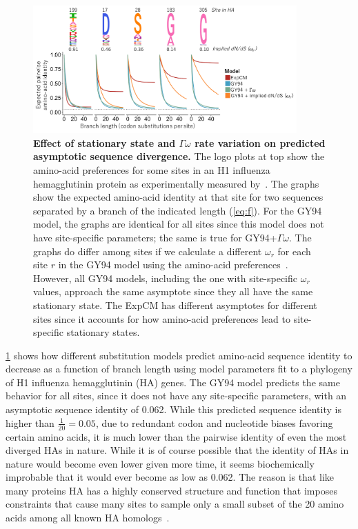 \documentclass[11pt]{article}
\begin{document}
\begin{figure}
\centerline{\includegraphics[width=0.90\textwidth]{figures/decay.pdf}}
\caption{\label{fig:decay}
\textbf{Effect of stationary state and $\Gamma\omega$ rate variation on predicted asymptotic sequence divergence.}
The logo plots at top show the amino-acid preferences for some sites in an H1 influenza hemagglutinin protein as experimentally measured by~\citet{doud2016accurate}.
The graphs show the expected amino-acid identity at that site for two sequences separated by a branch of the indicated length (\ref{eq:f}).
For the GY94 model, the graphs are identical for all sites since this model does not have site-specific parameters; the same is true for GY94+$\Gamma\omega$.
The graphs do differ among sites if we calculate a different $\omega_r$ for each site $r$ in the GY94 model using the amino-acid preferences~\citep[\ref{eq:w_r};][]{spielman2015relationship}.
However, all GY94 models, including the one with site-specific $\omega_r$ values, approach the same asymptote since they all have the same stationary state.
The ExpCM has different asymptotes for different sites since it accounts for how amino-acid preferences lead to site-specific stationary states.
}
\end{figure}

\ref{fig:decay} shows how different substitution models predict amino-acid sequence identity to decrease as a function of branch length using model parameters fit to a phylogeny of H1 influenza hemagglutinin (HA) genes.
The GY94 model predicts the same behavior for all sites, since it does not have any site-specific parameters, with an asymptotic sequence identity of 0.062. 
While this predicted sequence identity is higher than $\frac{1}{20} = 0.05$, due to redundant codon and nucleotide biases favoring certain amino acids, it is much lower than the pairwise identity of even the most diverged HAs in nature.
While it is of course possible that the identity of HAs in nature would become even lower given more time, it seems biochemically improbable that it would ever become as low as 0.062. 
The reason is that like many proteins HA has a highly conserved structure and function that imposes constraints that cause many sites to sample only a small subset of the 20 amino acids among all known HA homologs~\citep{nobusawa1991comparison}.
\end{document}
